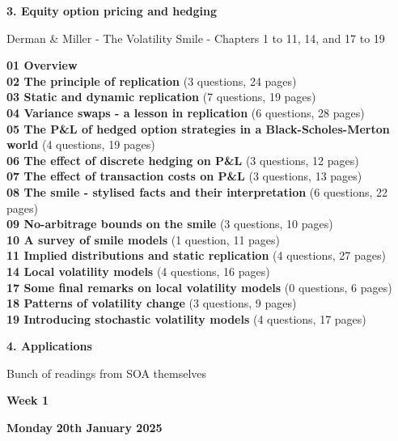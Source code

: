 \documentclass[hidelinks, 12pt]{article}
\theoremstyle{mydefstyle}
\theoremstyle{mythmstyle}
\begin{document}
\begin{center}
\textbf{3. Equity option pricing and hedging}
\end{center}

Derman \& Miller - The Volatility Smile - Chapters 1 to 11, 14, and 17 to 19

\textbf{01 Overview} \\
\textbf{02 The principle of replication} (3 questions, 24 pages) \\
\textbf{03 Static and dynamic replication} (7 questions, 19 pages) \\
\textbf{04 Variance swaps - a lesson in replication} (6 questions, 28 pages) \\
\textbf{05 The P\&L of hedged option strategies in a Black-Scholes-Merton world} (4 questions, 19 pages) \\
\textbf{06 The effect of discrete hedging on P\&L} (3 questions, 12 pages) \\
\textbf{07 The effect of transaction costs on P\&L} (3 questions, 13 pages) \\
\textbf{08 The smile - stylised facts and their interpretation} (6 questions, 22 pages) \\
\textbf{09 No-arbitrage bounds on the smile} (3 questions, 10 pages) \\
\textbf{10 A survey of smile models} (1 question, 11 pages) \\

\textbf{11 Implied distributions and static replication} (4 questions, 27 pages) \\
\textbf{14 Local volatility models} (4 questions, 16 pages) \\
\textbf{17 Some final remarks on local volatility models} (0 questions, 6 pages) \\
\textbf{18 Patterns of volatility change} (3 questions, 9 pages) \\
\textbf{19 Introducing stochastic volatility models} (4 questions, 17 pages)

\begin{center}
\textbf{4. Applications}
\end{center}

Bunch of readings from SOA themselves

\newpage

\begin{center}
\textbf{Week 1}
\end{center}

\textbf{Monday} \hfill \textbf{20th January 2025}
\end{document}

